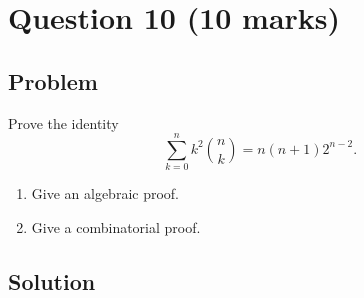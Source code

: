 \documentclass[12pt]{article}
\begin{document}
\newpage
\section{Question 10 \hfill (10 marks)}
\subsection{Problem}

Prove the identity
\[
\sum_{k=0}^{n} k^2\binom{n}{k}=n(n+1)2^{n-2}.
\]

\begin{enumerate}[label=(\alph*)]
    \item Give an algebraic proof.
    \item Give a combinatorial proof.
\end{enumerate}

\subsection{Solution}
\end{document}
